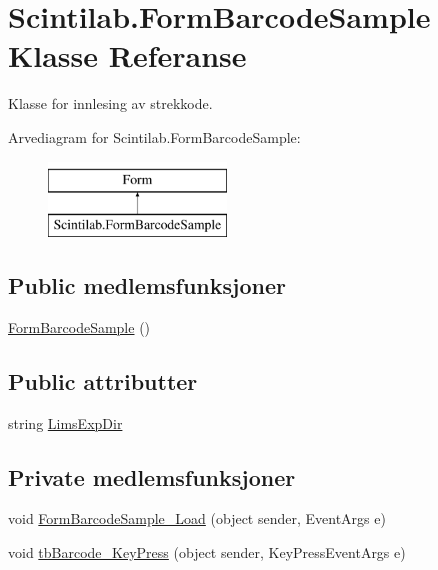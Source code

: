 \hypertarget{class_scintilab_1_1_form_barcode_sample}{\section{Scintilab.\+Form\+Barcode\+Sample Klasse Referanse}
\label{class_scintilab_1_1_form_barcode_sample}
}


Klasse for innlesing av strekkode.  


Arvediagram for Scintilab.\+Form\+Barcode\+Sample\+:\begin{figure}[H]
\begin{center}
\leavevmode
\includegraphics[height=2.000000cm]{class_scintilab_1_1_form_barcode_sample}
\end{center}
\end{figure}
\subsection*{Public medlemsfunksjoner}
\begin{DoxyCompactItemize}
\item 
\hyperlink{class_scintilab_1_1_form_barcode_sample_afa5bb07ddccac228368eb3f59f0672fd}{Form\+Barcode\+Sample} ()
\end{DoxyCompactItemize}
\subsection*{Public attributter}
\begin{DoxyCompactItemize}
\item 
string \hyperlink{class_scintilab_1_1_form_barcode_sample_ab07f8e1b4f86eff4eee9dd0df093b95e}{Lims\+Exp\+Dir}
\end{DoxyCompactItemize}
\subsection*{Private medlemsfunksjoner}
\begin{DoxyCompactItemize}
\item 
void \hyperlink{class_scintilab_1_1_form_barcode_sample_ad08397e3cdc5427ab49b8de6a88d0d13}{Form\+Barcode\+Sample\+\_\+\+Load} (object sender, Event\+Args e)
\item 
void \hyperlink{class_scintilab_1_1_form_barcode_sample_a01d68f5fcee6ba554ad38367981a897a}{tb\+Barcode\+\_\+\+Key\+Press} (object sender, Key\+Press\+Event\+Args e)
\end{DoxyCompactItemize}

